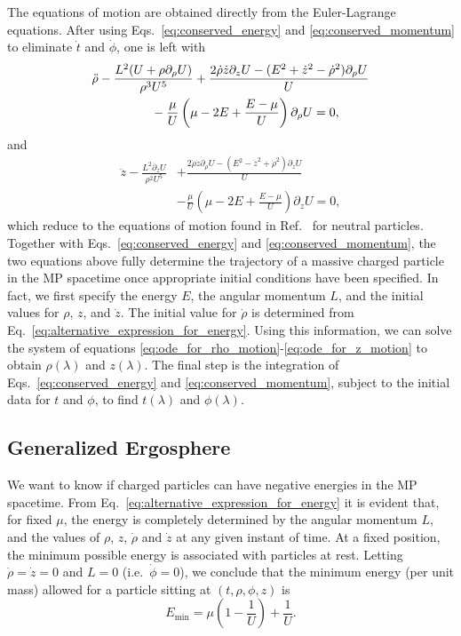 The equations of motion are obtained directly from the Euler-Lagrange equations. After using Eqs.~\eqref{eq:conserved_energy} and \eqref{eq:conserved_momentum} to eliminate $\dot{t}$ and $\dot{\phi}$, one is left with
%
\begin{align}
  \ddot{\rho} & -\frac{L^2(U +\rho \partial_{\rho}U)}{\rho^3 U^5} + \frac{2\dot{\rho}\dot{z}\partial_{z}U - (E^2 + \dot{z}^2 - \dot{\rho}^2)\partial_{\rho}U}{U} \nonumber \\ & \hspace{1.5cm} - \frac{\mu}{U}\left(\mu-2 E+\frac{E-\mu}{U}\right)\partial_{\rho}U = 0,
  \label{eq:ode_for_rho_motion}
\end{align}
%
and
\begin{align}
  \ddot{z} - \frac{L^2\partial_{z}U}{\rho^2 U^5} & + \frac{2\dot{\rho}\dot{z}\partial_{\rho}U - (E^2 - \dot{z}^2 + \dot{\rho}^2)\partial_{z}U}{U} \nonumber \\ &-  \frac{\mu}{U}\left(\mu-2 E+\frac{ E-\mu}{U}\right)\partial_{z}U = 0,
  \label{eq:ode_for_z_motion}
\end{align}
which reduce to the equations of motion found in Ref.~\cite{ASSUMPCAO2018} for neutral particles. Together with Eqs.~\eqref{eq:conserved_energy} and \eqref{eq:conserved_momentum}, the two equations above fully determine the trajectory of a massive charged particle in the \ac{MP} spacetime once appropriate initial conditions have been specified. In fact, we first specify the energy $E$, the angular momentum $L$, and the initial values for $\rho$, $z$, and $\dot z$. The initial value for $\dot{\rho}$ is determined from Eq.~\eqref{eq:alternative_expression_for_energy}. Using this information, we can solve the system of equations \eqref{eq:ode_for_rho_motion}-\eqref{eq:ode_for_z_motion} to obtain $\rho(\lambda)$ and $z(\lambda)$. The final step is the integration of Eqs.~\eqref{eq:conserved_energy} and \eqref{eq:conserved_momentum}, subject to the initial data for $t$ and $\phi$, to find $t(\lambda)$ and $\phi(\lambda)$.

\subsection{Generalized Ergosphere} \label{Sec:gen_ergo}

We want to know if charged particles can have negative energies in the \ac{MP} spacetime. From Eq.~\eqref{eq:alternative_expression_for_energy} it is evident that, for fixed $\mu$, the energy is completely determined by the angular momentum $L$, and the values of $\rho$, $z$, $\dot{\rho}$ and $\dot{z}$  at any given instant of time. At a fixed position, the minimum possible energy is associated with particles at rest. Letting $\dot{\rho}=\dot{z}=0$ and $L=0$ (i.e.~$\dot{\phi}=0$), we conclude that the minimum energy (per unit mass) allowed for a particle sitting at $(t,\rho,\phi,z)$ is
\begin{equation} \label{eq:minimum_energy}
  E_{\mathrm{min}} = \mu\left(1-\frac{1}{U}\right) + \frac{1}{U}.
\end{equation}

